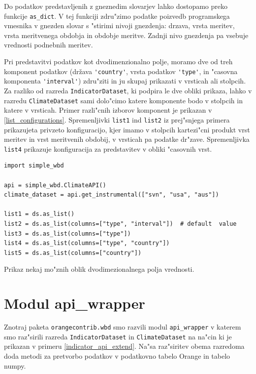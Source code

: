 Do podatkov predstavljenih z gneznedim slovarjev lahko dostopamo preko funkcije
\verb|as_dict|. V tej funkciji zdru"zimo podatke poizvedb programskega
vmesnika v gnezden slovar s "stirimi nivoji gnezdenja: drzava, vrsta meritev,
vrsta meritvenega obdobja in obdobje meritve. Zadnji nivo gnezdenja pa vsebuje
vrednosti podnebnih meritev.

Pri predstavitvi podatkov kot dvodimenzionalno polje, moramo dve od treh
komponent podatkov (država \verb|'country'|, vrsta podatkov \verb|'type'|, 
in "casovna komponenta \verb|'interval'|)
zdru"ziti in ju skupaj prikazati v vrsticah ali stolpcih. Za razliko od razreda
\verb|IndicatorDataset|, ki podpira le dve obliki prikaza, lahko v razredu
\verb|ClimateDataset| sami dolo"cimo katere komponente bodo v stolpcih in
katere v vrsticah. Primer razli"cnih izborov komponent je prikazan v
\ref{list_configurations}. Spremenljivki \verb|list1| ind \verb|list2| iz
prej"snjega primera prikazujeta privzeto konfiguracijo, kjer imamo v stolpcih
kartezi"cni produkt vrst meritev in vrst meritvenih obdobij, v vrsticah pa
podatke dr"zave. Spremenljivka \verb|list4| prikazuje konfiguracija za
predstavitev v obliki "casovnih vrst.

\begin{snippet}
\begin{center}
\begin{lstlisting}
import simple_wbd

api = simple_wbd.ClimateAPI()                   
climate_dataset = api.get_instrumental(["svn", "usa", "aus"])

list1 = ds.as_list()
list2 = ds.as_list(columns=["type", "interval"])  # default  value
list3 = ds.as_list(columns=["type"])
list4 = ds.as_list(columns=["type", "country"]) 
list5 = ds.as_list(columns=["country"])
\end{lstlisting}
\end{center}
\cprotect
\caption{Prikaz nekaj mo"znih oblik dvodimezionalnega polja vrednosti.} 
\label{list_configurations}
\end{snippet} 



\section{Modul api\_wrapper}


Znotraj paketa \verb|orangecontrib.wbd| smo razvili modul \verb|api_wrapper| v
katerem smo raz"sirili razreda \verb|IndicatorDataset| in \verb|ClimateDataset|
na na"cin ki je prikazan v primeru \ref{indicator_api_extend}. Na"sa
raz"siritev obema razredoma doda metodi za pretvorbo podatkov v podatkovno 
tabelo Orange in tabelo numpy.


